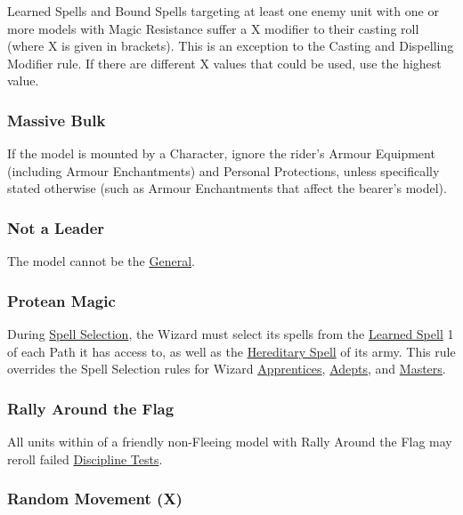Learned Spells and Bound Spells targeting at least one enemy unit with one or more models with Magic Resistance suffer a \minuss{}X modifier to their casting roll (where X is given in brackets). This is an exception to the Casting and Dispelling Modifier rule. If there are different X values that could be used, use the highest value.

\subsubsection{Massive Bulk}
\idx[main=y]{\massivebulk}\label{massive_bulk}

If the model is mounted by a Character, ignore the rider's Armour Equipment (including Armour Enchantments) and Personal Protections, unless specifically stated otherwise (such as Armour Enchantments that affect the bearer's model).

\subsubsection{Not a Leader}
\idx[main=y]{\notaleader}\label{not_a_leader}

The model cannot be the \hyperref[the_general]{General}.

\subsubsection{Protean Magic}
\idx[main=y]{\proteanmagic}\label{protean_magic}

During \hyperref[spell_selection]{Spell Selection}, the Wizard must select its spells from the \hyperref[learned_spells]{Learned Spell} 1 of each Path it has access to, as well as the \hyperref[hereditary_spells]{Hereditary Spell} of its army. This rule overrides the Spell Selection rules for Wizard \hyperref[wizard_apprentice]{Apprentices}, \hyperref[wizard_adept]{Adepts}, and \hyperref[wizard_master]{Masters}.

\subsubsection{Rally Around the Flag}
\idx[main=y]{\rallyaroundtheflag}\label{rally_around_the_flag}

All units within  of a friendly non-Fleeing model with Rally Around the Flag may reroll failed \hyperref[discipline_tests]{Discipline Tests}.

\subsubsection{Random Movement (X)}
\idx[main=y]{\randommovement{}}\label{random_movement}

